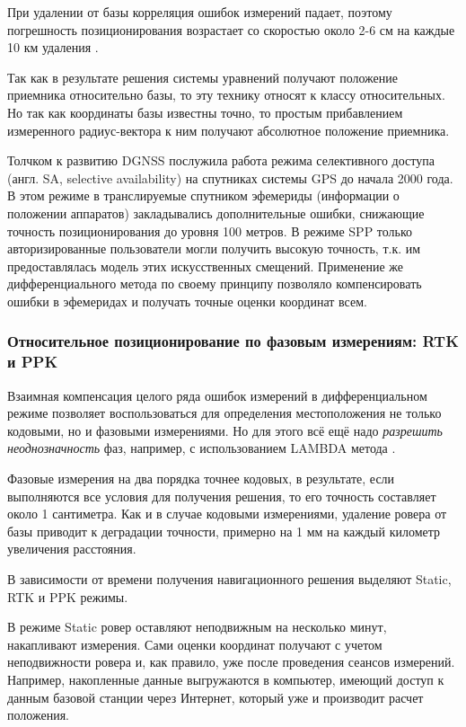 При удалении от базы корреляция ошибок измерений падает, поэтому погрешность позиционирования возрастает со скоростью около 2-6 см на каждые 10 км удаления \cite{federalRadionavigationPlan2001, monteiro2005}. 

Так как в результате решения системы уравнений получают положение приемника относительно базы, то эту технику относят к классу относительных. 
Но так как координаты базы известны точно, то простым прибавлением измеренного радиус-вектора к ним получают абсолютное положение приемника.

Толчком к развитию DGNSS послужила работа режима селективного доступа (англ. SA, selective availability) на спутниках системы GPS до начала 2000 года. 
В этом режиме в транслируемые спутником эфемериды (информации о положении аппаратов) закладывались дополнительные ошибки, снижающие точность позиционирования до уровня 100 метров. 
В режиме SPP только авторизированные пользователи могли получить высокую точность, т.к. им предоставлялась модель этих искусственных смещений. 
Применение же дифференциального метода по своему принципу позволяло компенсировать ошибки в эфемеридах и получать точные оценки координат всем.

\subsubsection{Относительное позиционирование по фазовым измерениям: RTK и PPK}

Взаимная компенсация целого ряда ошибок измерений в дифференциальном режиме позволяет воспользоваться для определения местоположения не только кодовыми, но и фазовыми измерениями. 
Но для этого всё ещё надо \textit{разрешить неоднозначность} фаз, например, с использованием LAMBDA метода \cite{teunissen1993}.

Фазовые измерения на два порядка точнее кодовых, в результате, если выполняются все условия для получения решения, то его точность составляет около 1 сантиметра.
Как и в случае кодовыми измерениями, удаление ровера от базы приводит к деградации точности, примерно на 1 мм на каждый километр увеличения расстояния. 

В зависимости от времени получения навигационного решения выделяют Static, RTK и PPK режимы. 

В режиме Static ровер оставляют неподвижным на несколько минут, накапливают измерения. 
Сами оценки координат получают с учетом неподвижности ровера и, как правило, уже после проведения сеансов измерений. 
Например, накопленные данные выгружаются в компьютер, имеющий доступ к данным базовой станции через Интернет, который уже и производит расчет положения. 


